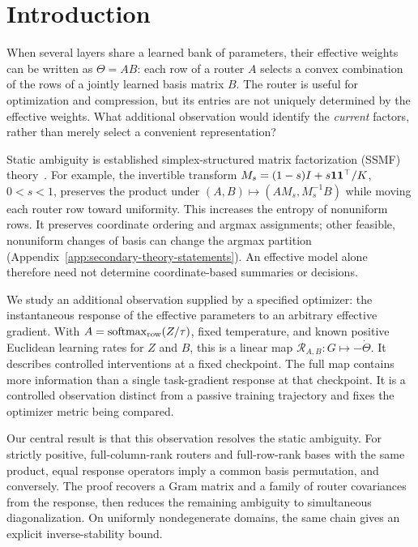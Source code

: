 \section{Introduction}

When several layers share a learned bank of parameters, their effective
weights can be written as $\Theta=AB$: each row of a router $A$ selects a
convex combination of the rows of a jointly learned basis matrix $B$.
The router is useful for optimization and compression, but its entries are
not uniquely determined by the effective weights. What additional observation
would identify the \emph{current} factors, rather than merely select a
convenient representation?

Static ambiguity is established simplex-structured matrix factorization
(SSMF) theory~\citep{vuthanh2023bounded}. For example, the invertible
transform $M_s=(1-s)I+s\mathbf{1}\mathbf{1}^\top/K$, $0<s<1$, preserves the product
under $(A,B)\mapsto(AM_s,M_s^{-1}B)$ while moving each router row toward
uniformity. This increases the entropy of nonuniform rows. It preserves
coordinate ordering and argmax assignments; other feasible, nonuniform
changes of basis can change the argmax partition
(Appendix~\ref{app:secondary-theory-statements}). An effective model alone
therefore need not determine coordinate-based summaries or decisions.

We study an additional observation supplied by a specified optimizer:
the instantaneous response of the effective parameters to an arbitrary
effective gradient. With $A=\operatorname{softmax}_{\rm row}(Z/\tau)$,
fixed temperature, and known positive Euclidean learning rates for $Z$ and
$B$, this is a linear map $\mathcal R_{A,B}:G\mapsto-\dot\Theta$.
It describes controlled interventions at a fixed checkpoint. The full map contains more information than a single task-gradient
response at that checkpoint. It is a controlled observation distinct from
a passive training trajectory and fixes the optimizer metric being compared.

Our central result is that this observation resolves the static ambiguity.
For strictly positive, full-column-rank routers and full-row-rank bases
with the same product, equal response operators imply a common basis
permutation, and conversely. The proof recovers a Gram matrix and a family
of router covariances from the response, then reduces the remaining
ambiguity to simultaneous diagonalization. On uniformly nondegenerate
domains, the same chain gives an explicit inverse-stability bound.

